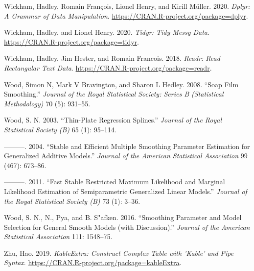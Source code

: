 \documentclass[conference,final,]{IEEEtran}
\begin{document}
\leavevmode\hypertarget{ref-R-dplyr}{}%
Wickham, Hadley, Romain François, Lionel Henry, and Kirill Müller. 2020. \emph{Dplyr: A Grammar of Data Manipulation}. \url{https://CRAN.R-project.org/package=dplyr}.

\leavevmode\hypertarget{ref-R-tidyr}{}%
Wickham, Hadley, and Lionel Henry. 2020. \emph{Tidyr: Tidy Messy Data}. \url{https://CRAN.R-project.org/package=tidyr}.

\leavevmode\hypertarget{ref-R-readr}{}%
Wickham, Hadley, Jim Hester, and Romain Francois. 2018. \emph{Readr: Read Rectangular Text Data}. \url{https://CRAN.R-project.org/package=readr}.

\leavevmode\hypertarget{ref-wood2008soap}{}%
Wood, Simon N, Mark V Bravington, and Sharon L Hedley. 2008. ``Soap Film Smoothing.'' \emph{Journal of the Royal Statistical Society: Series B (Statistical Methodology)} 70 (5): 931--55.

\leavevmode\hypertarget{ref-R-mgcv_d}{}%
Wood, S. N. 2003. ``Thin-Plate Regression Splines.'' \emph{Journal of the Royal Statistical Society (B)} 65 (1): 95--114.

\leavevmode\hypertarget{ref-R-mgcv_c}{}%
---------. 2004. ``Stable and Efficient Multiple Smoothing Parameter Estimation for Generalized Additive Models.'' \emph{Journal of the American Statistical Association} 99 (467): 673--86.

\leavevmode\hypertarget{ref-R-mgcv_a}{}%
---------. 2011. ``Fast Stable Restricted Maximum Likelihood and Marginal Likelihood Estimation of Semiparametric Generalized Linear Models.'' \emph{Journal of the Royal Statistical Society (B)} 73 (1): 3--36.

\leavevmode\hypertarget{ref-R-mgcv_b}{}%
Wood, S. N., N., Pya, and B. S"afken. 2016. ``Smoothing Parameter and Model Selection for General Smooth Models (with Discussion).'' \emph{Journal of the American Statistical Association} 111: 1548--75.

\leavevmode\hypertarget{ref-R-kableExtra}{}%
Zhu, Hao. 2019. \emph{KableExtra: Construct Complex Table with 'Kable' and Pipe Syntax}. \url{https://CRAN.R-project.org/package=kableExtra}.
\end{document}
